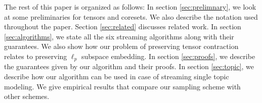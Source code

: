 The rest of this paper is organized as follows: In section \ref{sec:prelimnary}, we look at some preliminaries for tensors and coresets. We also describe the notation used throughout the paper. Section \ref{sec:related} discusses related work. In section \ref{sec:algorithms}, we state all the six streaming algorithms along with their guarantees. We also show how our problem of preserving tensor contraction relates to preserving $\ell_{p}$ subspace embedding. In section \ref{sec:proofs}, we describe the guarantees given by our algorithm and their proofs. In section \ref{sec:topic}, we describe how our algorithm can be used in case of streaming single topic modeling. We give empirical results that compare our sampling scheme with other schemes.
% 
